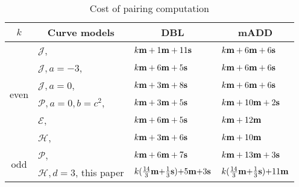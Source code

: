 \begin{table}[h]
\centering
\caption{Cost of pairing computation}

\begin{tabular}{ l | l | l | l}
\hline
\multicolumn{1}{c|}{$k$}
&\multicolumn{1}{c|}{Curve models}	&\multicolumn{1}{c|}{DBL}	&\multicolumn{1}{c}{mADD}	\\
\hline
\multicolumn{1}{c|}{\multirow{6}{*}{even}}
&$\mathcal{J}$, \cite{2008/IonicaJoux08} \cite{2009/fastertate}
				&$k\textbf{m} + 1\textbf{m} + 11\textbf{s}	$	&$k\textbf{m} + 6\textbf{m} + 6\textbf{s}$	\\
&$\mathcal{J},a = -3$, \cite{2009/fastertate}
				&$k\textbf{m} + 6\textbf{m} + 5\textbf{s}$		&$k\textbf{m} + 6\textbf{m} + 6\textbf{s}$	\\
&$\mathcal{J},a = 0$, \cite{2009/fastertate}		
				&$k\textbf{m} + 3\textbf{m} + 8\textbf{s}$		&$k\textbf{m} + 6\textbf{m} + 6\textbf{s}$	\\
&$\mathcal{P},a = 0, b = c^2$, \cite{2009/craig}
				&$k\textbf{m} + 3\textbf{m} + 5\textbf{s}$		&$k\textbf{m} + 10\textbf{m} + 2\textbf{s}$	\\
&$\mathcal{E}$, \cite{2009/fastertate}			
				&$k\textbf{m} + 6\textbf{m} + 5\textbf{s}$		&$k\textbf{m} + 12\textbf{m}$	\\
&$\mathcal{H}$, \cite{2010/Gu}	&$k\textbf{m} + 3\textbf{m} + 6\textbf{s}$		&$k\textbf{m} + 10\textbf{m}$	\\
\hline
\multicolumn{1}{c|}{\multirow{2}{*}{odd}}
&$\mathcal{P}$, \cite{2010/CLN}	&$k\textbf{m} + 6\textbf{m} + 7\textbf{s}$		&$k\textbf{m} + 13\textbf{m} + 3\textbf{s}$	\\
&$\mathcal{H},d=3$, this paper
				&$k(\frac{14}{3}\textbf{m} {+} \frac{1}{3}\textbf{s}) {+} 5\textbf{m} {+} 3\textbf{s}$
									&$k(\frac{14}{3}\textbf{m} {+} \frac{1}{3}\textbf{s}) {+} 11\textbf{m}$	\\
\hline
\end{tabular}
\label{tbl-cmp}


\end{table}

